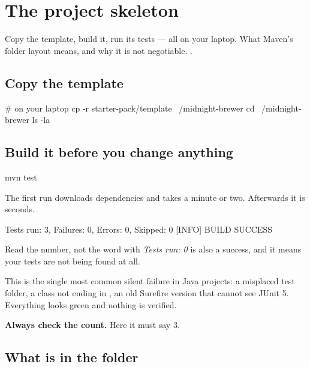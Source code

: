 \chapter{The project skeleton}
\label{ch:project}

\chapterbrief
  {Copy the template, build it, run its tests --- all on your laptop.}
  {What Maven's folder layout means, and why it is not negotiable.}
  {.}

\section{Copy the template}

\begin{shell}
# on your laptop
cp -r starter-pack/template ~/midnight-brewer
cd ~/midnight-brewer
ls -la
\end{shell}

\section{Build it before you change anything}

\begin{shell}
mvn test
\end{shell}

The first run downloads dependencies and takes a minute or two. Afterwards it is
seconds.

\begin{trace}
[INFO] Tests run: 3, Failures: 0, Errors: 0, Skipped: 0
[INFO] BUILD SUCCESS
\end{trace}

\begin{trap}{Read the number, not the word}
 with \emph{Tests run: 0} is also a success, and it means
your tests are not being found at all.

This is the single most common silent failure in Java projects: a misplaced test
folder, a class not ending in , an old Surefire version that cannot
see JUnit 5. Everything looks green and nothing is verified.

\textbf{Always check the count.} Here it must say 3.
\end{trap}

\section{What is in the folder}

